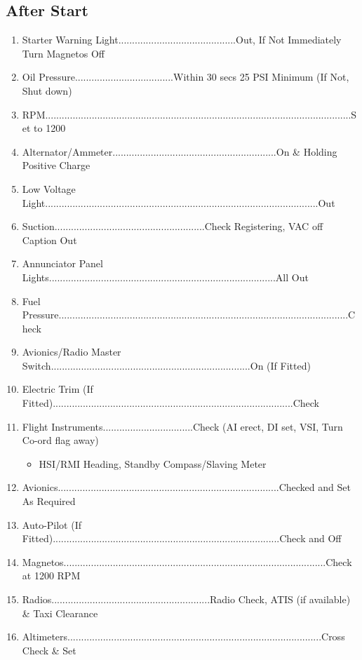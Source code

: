\documentclass[a4paper]{article}
\newenvironment{checklist}{
  \begin{itemize}[leftmargin=*, align=left]
    \setlength{\itemsep}{2pt}
    \setlength{\parskip}{0pt}
    \setlength{\parsep}{0pt}
}{
  \end{itemize}
}
\newenvironment{numberedchecklist}{
  \begin{enumerate}[label=\arabic*., leftmargin=*, align=left]
    \setlength{\itemsep}{2pt}
    \setlength{\parskip}{0pt}
    \setlength{\parsep}{0pt}
}{
  \end{enumerate}
}
\begin{document}
\subsection*{After Start}
\begin{numberedchecklist}
\item Starter Warning Light...........................................Out, If Not Immediately Turn Magnetos Off
\item Oil Pressure....................................Within 30 secs 25 PSI Minimum (If Not, Shut down)
\item RPM................................................................................................................Set to 1200
\item Alternator/Ammeter............................................................On \& Holding Positive Charge
\item Low Voltage Light....................................................................................................Out
\item Suction.......................................................Check Registering, VAC off Caption Out
\item Annunciator Panel Lights...................................................................................All Out
\item Fuel Pressure..........................................................................................................Check
\item Avionics/Radio Master Switch.........................................................................On (If Fitted)
\item Electric Trim (If Fitted)........................................................................................Check
\item Flight Instruments.................................Check (AI erect, DI set, VSI, Turn Co-ord flag away)
  \begin{checklist}
  \item HSI/RMI Heading, Standby Compass/Slaving Meter
  \end{checklist}
\item Avionics.................................................................................Checked and Set As Required
\item Auto-Pilot (If Fitted)...................................................................................Check and Off
\item Magnetos................................................................................................Check at 1200 RPM
\item Radios..........................................................Radio Check, ATIS (if available) \& Taxi Clearance
\item Altimeters.............................................................................................Cross Check \& Set
\end{numberedchecklist}
\end{document}
